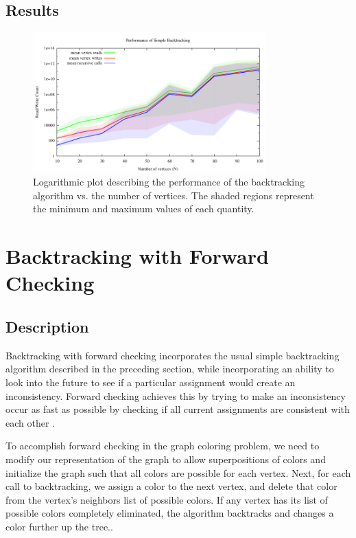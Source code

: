 \documentclass{article}
\begin{document}
	
	\subsection{Results}
		
		\begin{figure}[h!]
			\centering
			\includegraphics[width=0.8\textwidth]{../results_5/backtracking_simple/bt_simple_performance}
			\caption{Logarithmic plot describing the performance of the backtracking algorithm vs. the number of vertices. The shaded regions represent the minimum and maximum values of each quantity.}
		\end{figure}
	
\section{Backtracking with Forward Checking}

	\subsection{Description}
	
		Backtracking with forward checking incorporates the usual simple backtracking algorithm described in the preceding section, while incorporating an ability to look into the future to see if a particular assignment would create an inconsistency. Forward checking achieves this by trying to make an inconsistency occur as fast as possible by checking if all current assignments are consistent with each other \cite{haralick}.
		
		To accomplish forward checking in the graph coloring problem, we need to modify our representation of the graph to allow superpositions of colors and initialize the graph such that all colors are possible for each vertex. Next, for each call to backtracking, we assign a color to the next vertex, and delete that color from the vertex's neighbors list of possible colors. If any vertex has its list of possible colors completely eliminated, the algorithm backtracks and changes a color further up the tree.\cite{ai}.
		
\end{document}
